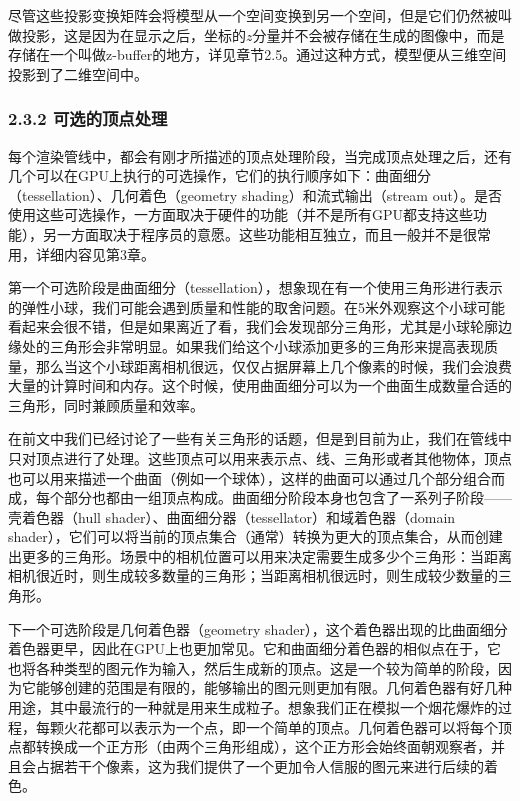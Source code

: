 \documentclass[
  paper=a4,
  ,captions=tableheading
]{scrartcl}
\begin{document}
尽管这些投影变换矩阵会将模型从一个空间变换到另一个空间，但是它们仍然被叫做投影，这是因为在显示之后，坐标的\(z\)分量并不会被存储在生成的图像中，而是存储在一个叫做z-buffer的地方，详见章节2.5。通过这种方式，模型便从三维空间投影到了二维空间中。

\subsubsection{2.3.2
可选的顶点处理}\label{ux53efux9009ux7684ux9876ux70b9ux5904ux7406}

每个渲染管线中，都会有刚才所描述的顶点处理阶段，当完成顶点处理之后，还有几个可以在GPU上执行的可选操作，它们的执行顺序如下：曲面细分（tessellation）、几何着色（geometry
shading）和流式输出（stream
out）。是否使用这些可选操作，一方面取决于硬件的功能（并不是所有GPU都支持这些功能），另一方面取决于程序员的意愿。这些功能相互独立，而且一般并不是很常用，详细内容见第3章。

第一个可选阶段是曲面细分（tessellation），想象现在有一个使用三角形进行表示的弹性小球，我们可能会遇到质量和性能的取舍问题。在5米外观察这个小球可能看起来会很不错，但是如果离近了看，我们会发现部分三角形，尤其是小球轮廓边缘处的三角形会非常明显。如果我们给这个小球添加更多的三角形来提高表现质量，那么当这个小球距离相机很远，仅仅占据屏幕上几个像素的时候，我们会浪费大量的计算时间和内存。这个时候，使用曲面细分可以为一个曲面生成数量合适的三角形，同时兼顾质量和效率。

在前文中我们已经讨论了一些有关三角形的话题，但是到目前为止，我们在管线中只对顶点进行了处理。这些顶点可以用来表示点、线、三角形或者其他物体，顶点也可以用来描述一个曲面（例如一个球体），这样的曲面可以通过几个部分组合而成，每个部分也都由一组顶点构成。曲面细分阶段本身也包含了一系列子阶段------壳着色器（hull
shader）、曲面细分器（tessellator）和域着色器（domain
shader），它们可以将当前的顶点集合（通常）转换为更大的顶点集合，从而创建出更多的三角形。场景中的相机位置可以用来决定需要生成多少个三角形：当距离相机很近时，则生成较多数量的三角形；当距离相机很远时，则生成较少数量的三角形。

下一个可选阶段是几何着色器（geometry
shader），这个着色器出现的比曲面细分着色器更早，因此在GPU上也更加常见。它和曲面细分着色器的相似点在于，它也将各种类型的图元作为输入，然后生成新的顶点。这是一个较为简单的阶段，因为它能够创建的范围是有限的，能够输出的图元则更加有限。几何着色器有好几种用途，其中最流行的一种就是用来生成粒子。想象我们正在模拟一个烟花爆炸的过程，每颗火花都可以表示为一个点，即一个简单的顶点。几何着色器可以将每个顶点都转换成一个正方形（由两个三角形组成），这个正方形会始终面朝观察者，并且会占据若干个像素，这为我们提供了一个更加令人信服的图元来进行后续的着色。
\end{document}
